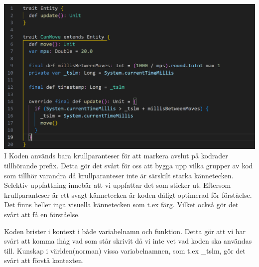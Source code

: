 \includegraphics[width=15cm]{fina_koden.png}
I Koden används bara krullparanteser för att markera avslut på kodrader tillhörande prefix.
Detta gör det svårt för oss att bygga upp vilka grupper av kod som tillhör varandra då krullparanteser inte är särskilt starka kännetecken.
Selektiv uppfattning innebär att vi uppfattar det som sticker ut.
Eftersom krullparanteser är ett svagt kännetecken är koden dåligt optimerad för förståelse.
Det finns heller inga visuella kännetecken som t.ex färg. Vilket också gör det svårt att få en förståelse.

Koden brister i kontext i både variabelnamn och funktion.
Detta gör att vi har svårt att komma ihåg vad som står skrivit då vi inte vet vad koden ska användas till.
Kunskap i världen(norman) vissa variabelnamnen, som t.ex _tslm, gör det svårt att förstå kontexten.




